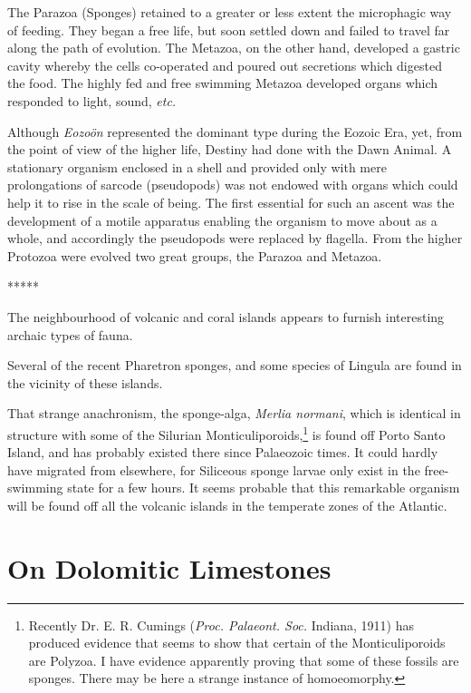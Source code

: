 \documentclass[a4paper, 12pt, oneside]{article}
\begin{document}
The Parazoa (Sponges) retained to a greater or less extent the microphagic way of feeding. They began a free life, but soon settled down and failed to travel far along the path of evolution. The Metazoa, on the other hand, developed a gastric cavity whereby the cells co-operated and poured out secretions which digested the food. The highly fed and free swimming Metazoa developed organs which responded to light, sound, \emph{etc.}

Although \emph{Eozoön} represented the dominant type during the Eozoic Era, yet, from the point of view of the higher life, Destiny had done with the Dawn Animal. A stationary organism enclosed in a shell and provided only with mere prolongations of sarcode (pseudopods) was not endowed with organs which could help it to rise in the scale of being. The first essential for such an ascent was the development of a motile apparatus enabling the organism to move about as a whole, and accordingly the pseudopods were replaced by flagella. From the higher Protozoa were evolved two great groups, the Parazoa and Metazoa.

\centerline{*\hspace{15mm}*\hspace{15mm}*\hspace{15mm}*\hspace{15mm}*}
\bigskip

The neighbourhood of volcanic and coral islands appears to furnish interesting archaic types of fauna.

Several of the recent Pharetron sponges, and some species of Lingula are found in the vicinity of these islands.

That strange anachronism, the sponge-alga, \emph{Merlia normani}, which is identical in structure with some of the Silurian Monticuliporoids,\footnote{Recently Dr. E. R. Cumings (\emph{Proc. Palaeont. Soc.} Indiana, 1911) has produced evidence that seems to show that certain of the Monticuliporoids are Polyzoa. I have evidence apparently proving that some of these fossils are sponges. There may be here a strange instance of homoeomorphy.} is found off Porto Santo Island, and has probably existed there since Palaeozoic times. It could hardly have migrated from elsewhere, for Siliceous sponge larvae only exist in the free-swimming state for a few hours. It seems probable that this remarkable organism will be found off all the volcanic islands in the temperate zones of the Atlantic.
\clearpage
\section{On Dolomitic Limestones}
\end{document}
